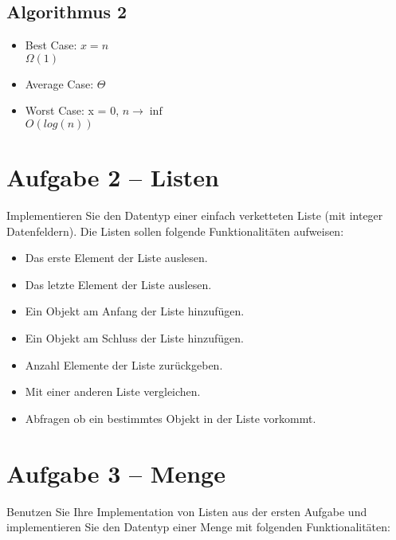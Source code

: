 \subsection*{Algorithmus 2}
\begin{itemize}
	\item Best Case:  $x = n$ \\
		  $\Omega(1)$
	\item Average Case:
		  $\Theta$
	\item Worst Case: x = 0, $n \rightarrow \inf$ \\
		  $O(log(n))$
\end{itemize}

\newpage

\section*{Aufgabe 2 – Listen}
Implementieren Sie den Datentyp einer einfach verketteten Liste (mit integer Datenfeldern). Die Listen sollen folgende Funktionalitäten aufweisen:\\

\begin{itemize}
	\item
		Das erste Element der Liste auslesen.
	\item
		Das letzte Element der Liste auslesen.
	\item
		Ein Objekt am Anfang der Liste hinzufügen.
	\item
		Ein Objekt am Schluss der Liste hinzufügen.
	\item
		Anzahl Elemente der Liste zurückgeben.
	\item
		Mit einer anderen Liste vergleichen.
	\item
		Abfragen ob ein bestimmtes Objekt in der Liste vorkommt.
\end{itemize}




\newpage

\section*{Aufgabe 3 – Menge}
Benutzen Sie Ihre Implementation von Listen aus der ersten Aufgabe und implementieren Sie den Datentyp einer Menge mit folgenden Funktionalitäten:

